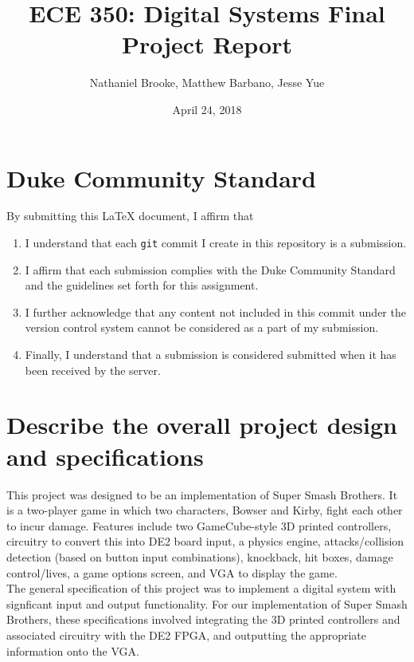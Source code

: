 \documentclass[12pt]{article} %
\begin{document}
\title{ECE 350: Digital Systems Final Project Report}
\author{Nathaniel Brooke, Matthew Barbano, Jesse Yue} %
\date{April 24, 2018} %
\maketitle

\section*{Duke Community Standard}

By submitting this \LaTeX{} document, I affirm that
\begin{enumerate}
    \item I understand that each \texttt{git} commit I create in this repository is a submission.
    \item I affirm that each submission complies with the Duke Community Standard and the guidelines set forth for this assignment.
    \item I further acknowledge that any content not included in this commit under the version control system cannot be considered as a part of my submission.
    \item Finally, I understand that a submission is considered submitted when it has been received by the server.
\end{enumerate}

\section{Describe the overall project design and specifications}
This project was designed to be an implementation of Super Smash Brothers. It is a two-player game in which two characters, Bowser and Kirby, fight each other to incur damage. Features include two GameCube-style 3D printed controllers, circuitry to convert this into DE2 board input, a physics engine, attacks/collision detection (based on button input combinations), knockback, hit boxes, damage control/lives, a game options screen, and VGA to display the game.\\

The general specification of this project was to implement a digital system with signficant input and output functionality. For our implementation of Super Smash Brothers, these specifications involved integrating the 3D printed controllers and associated circuitry with the DE2 FPGA, and outputting the appropriate information onto the VGA.\\
\end{document}
